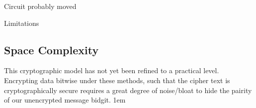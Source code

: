 \documentclass[a0,portrait]{a0poster}
\begin{document}
\begin{multicols}{2}
\begin{slide}{Circuit probably moved}
\begin{multicols}{3}
\end{multicols}


\end{slide}



\begin{slide}{Limitations}
\subsection*{Space Complexity}
  This cryptographic model has not yet been refined to a practical level. Encrypting data bitwise under these methods, such that the cipher text is cryptographically secure requires a great degree of noise/bloat to hide the pairity of our unencrypted message bidgit. 
\parskip 1em




\end{slide}
\end{multicols}
\end{document}
